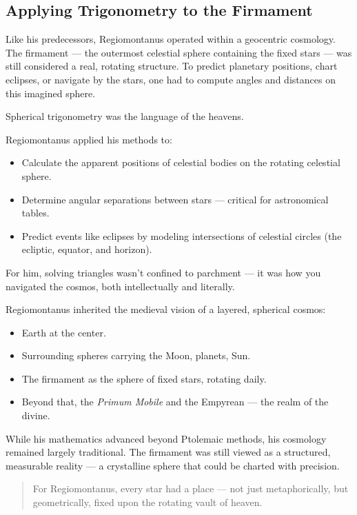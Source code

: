 \subsection{Applying Trigonometry to the Firmament}

Like his predecessors, Regiomontanus operated within a geocentric cosmology. The firmament — the outermost celestial sphere containing the fixed stars — was still considered a real, rotating structure. To predict planetary positions, chart eclipses, or navigate by the stars, one had to compute angles and distances on this imagined sphere.

Spherical trigonometry was the language of the heavens.

Regiomontanus applied his methods to:

\begin{itemize}
  \item Calculate the apparent positions of celestial bodies on the rotating celestial sphere.
  \item Determine angular separations between stars — critical for astronomical tables.
  \item Predict events like eclipses by modeling intersections of celestial circles (the ecliptic, equator, and horizon).
\end{itemize}

For him, solving triangles wasn’t confined to parchment — it was how you navigated the cosmos, both intellectually and literally.

Regiomontanus inherited the medieval vision of a layered, spherical cosmos:

\begin{itemize}
  \item Earth at the center.
  \item Surrounding spheres carrying the Moon, planets, Sun.
  \item The firmament as the sphere of fixed stars, rotating daily.
  \item Beyond that, the \textit{Primum Mobile} and the Empyrean — the realm of the divine.
\end{itemize}

While his mathematics advanced beyond Ptolemaic methods, his cosmology remained largely traditional. The firmament was still viewed as a structured, measurable reality — a crystalline sphere that could be charted with precision.

\begin{quote}
For Regiomontanus, every star had a place — not just metaphorically, but geometrically, fixed upon the rotating vault of heaven.
\end{quote}

